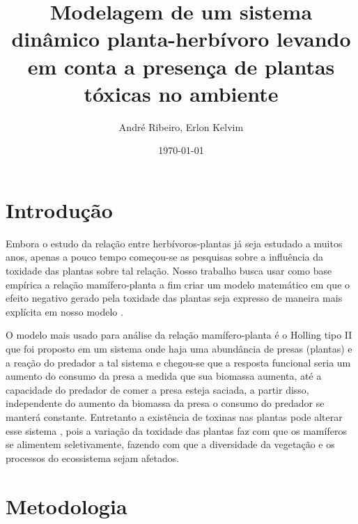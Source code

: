 \documentclass{article}
\title{Modelagem de um sistema dinâmico planta-herbívoro levando em conta a presença de plantas tóxicas no ambiente}
\author{André Ribeiro, Erlon Kelvim}
\date{\today}
\begin{document}
\maketitle

\newpage

\tableofcontents

\newpage

\section{Introdução}

Embora o estudo da relação entre herbívoros-plantas já seja estudado a muitos anos, apenas a pouco tempo começou-se as pesquisas sobre a influência da toxidade das plantas sobre tal relação. Nosso trabalho busca usar como base empírica a relação mamífero-planta a fim criar um modelo matemático em que o efeito negativo gerado pela toxidade das plantas seja expresso de maneira mais explícita em nosso modelo \cite{LI} \cite{FENG}.

O modelo mais usado para análise da relação mamífero-planta é o Holling tipo II \cite{CRAWFORD}\cite{HOLLING} que foi proposto em um sistema onde haja uma abundância de presas (plantas) e a reação do predador a tal sistema e chegou-se que a resposta funcional seria um aumento do consumo da presa a medida que sua biomassa aumenta, até a capacidade do predador de comer a presa esteja saciada, a partir disso, independente do aumento da biomassa da presa o consumo do predador se manterá constante. Entretanto a existência de toxinas nas plantas pode alterar esse sistema \cite{ZHILAN}, pois a variação da toxidade das plantas faz com que os mamíferos se alimentem seletivamente, fazendo com que a diversidade da vegetação e os processos do ecossistema sejam afetados.


\section{Metodologia}
\end{document}
